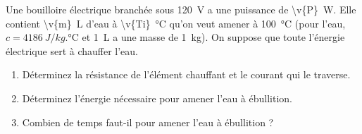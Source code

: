 Une bouilloire électrique branchée sous \qty{120}{V} a une puissance de \qty{\v{P}}{W}. Elle contient \qty{\v{m}}{L} d'eau à \qty{\v{Ti}}{\celsius} qu'on veut amener à \qty{100}{\celsius} (pour l'eau, $c = \qty{4186}{J/kg.\celsius}$ et \qty{1}{L} a une masse de \qty{1}{kg}). On suppose que toute l'énergie électrique sert à chauffer l'eau.

\begin{enumerate}[label=\alph*)]
    \item Déterminez la résistance de l'élément chauffant et le courant qui le traverse.
    \item Déterminez l'énergie nécessaire pour amener l'eau à ébullition.
    \item Combien de temps faut-il pour amener l'eau à ébullition ?
\end{enumerate}
